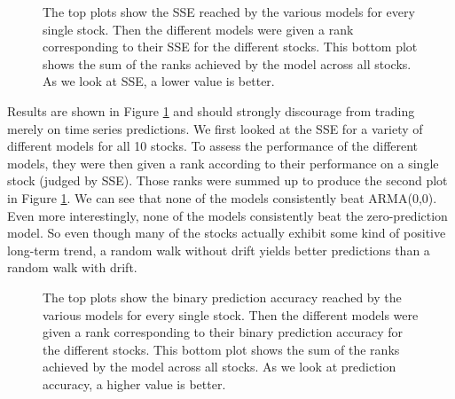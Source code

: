 \begin{figure}[h!]
    \centering
    \begin{adjustbox}{width = 0.95\linewidth}
    
    \end{adjustbox}
    \vspace{1ex}
    \begin{adjustbox}{width = 0.95\linewidth}
    
    \end{adjustbox}
    \caption{The top plots show the SSE reached by the various models for every single stock. Then the different models were given a rank corresponding to their SSE for the different stocks. This bottom plot shows the sum of the ranks achieved by the model across all stocks. As we look at SSE, a lower value is better.}
    \label{fig:models_ranked}
\end{figure}{}

Results are shown in Figure \ref{fig:models_ranked} and should strongly discourage from trading merely on time series predictions. We first looked at the SSE for a variety of different models for all 10 stocks. To assess the performance of the different models, they were then given a rank according to their performance on a single stock (judged by SSE). Those ranks were summed up to produce the second plot in Figure \ref{fig:models_ranked}. We can see that none of the models consistently beat ARMA(0,0). Even more interestingly, none of the models consistently beat the zero-prediction model. So even though many of the stocks actually exhibit some kind of positive long-term trend, a random walk without drift yields better predictions than a random walk with drift. 

\begin{figure}[h!]
    \centering
    \begin{adjustbox}{width = 0.95\linewidth}
    
    \end{adjustbox}
    \vspace{1ex}
    \begin{adjustbox}{width = 0.95\linewidth}
    
    \end{adjustbox}
    \caption{The top plots show the binary prediction accuracy reached by the various models for every single stock. Then the different models were given a rank corresponding to their binary prediction accuracy for the different stocks. This bottom plot shows the sum of the ranks achieved by the model across all stocks. As we look at prediction accuracy, a higher value is better.}
    \label{fig:models_ranked_binary}
\end{figure}

